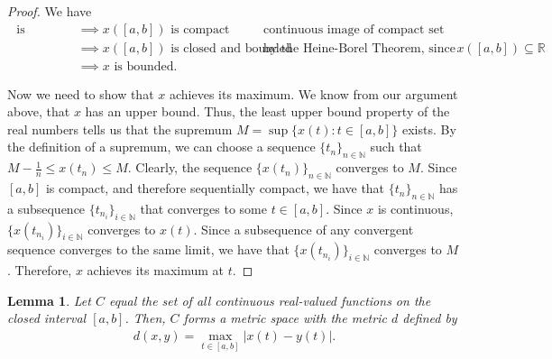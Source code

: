 \documentclass[10pt,a4paper]{article}
\theoremstyle{theorem}
\newtheorem{lemma}{Lemma}
\theoremstyle{definition}
\begin{document}
\begin{proof}
We have
\begin{align*}
[a, b] \text{ is compact} &\implies x([a, b]) \text{ is compact} && \text{continuous image of compact set}\\
&\implies x([a, b]) \text{ is closed and bounded} && \text{by the Heine-Borel Theorem, since } x([a, b]) \subseteq \mathbb{R}\\
&\implies x \text{ is bounded}.
\end{align*}

Now we need to show that $x$ achieves its maximum.  We know from our argument above, that $x$ has an upper bound. Thus, the least upper bound property of the real numbers tells us that the supremum $M = \sup \{x(t): t \in [a, b] \}$ exists. By the definition of a supremum, we can choose a sequence $\{t_n \}_{n \in \mathbb{N}}$ such that $M- \frac{1}{n} \leq x(t_n) \leq M$. Clearly, the sequence $\{x(t_n)\}_{n \in \mathbb{N}}$ converges to $M$. Since $[a, b]$ is compact, and therefore sequentially compact, we have that $\{t_n \}_{n \in \mathbb{N}}$ has a subsequence $\{t_{n_i} \}_{i \in \mathbb{N}}$ that converges to some $t \in [a, b]$. Since $x$ is continuous, $\{x(t_{n_i}) \}_{i \in \mathbb{N}}$ converges to $x(t)$. Since a subsequence of any convergent sequence converges to the same limit, we have that $\{x(t_{n_i}) \}_{i \in \mathbb{N}}$ converges to $M$. Therefore,  $x$ achieves its maximum at $t$.
\end{proof}

\begin{lemma}
Let $C$ equal the set of all continuous real-valued functions on the closed interval $[a, b]$. Then, $C$ forms a metric space with the metric $d$ defined by
\begin{align*}
d(x, y) = \max_{t \in [a, b]} |x(t) - y(t)|.
\end{align*}
\end{lemma}
\end{document}
